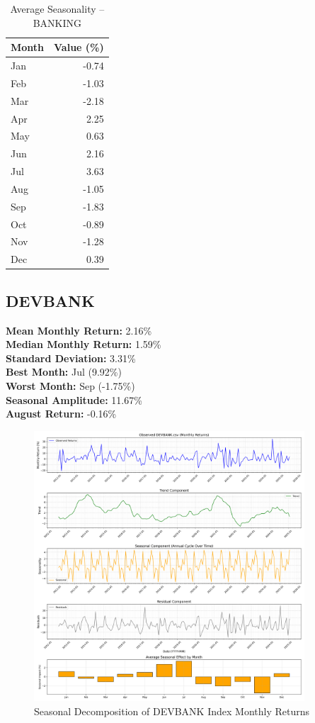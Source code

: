 \documentclass[12pt]{article}
\begin{document}
\begin{table}[h!]
\centering
\caption{Average Seasonality -- BANKING}
\begin{tabular}{l r}
\toprule
Month & Value (\%) \\
\midrule
Jan & -0.74 \\
Feb & -1.03 \\
Mar & -2.18 \\
Apr & 2.25 \\
May & 0.63 \\
Jun & 2.16 \\
Jul & 3.63 \\
Aug & -1.05 \\
Sep & -1.83 \\
Oct & -0.89 \\
Nov & -1.28 \\
Dec & 0.39 \\
\bottomrule
\end{tabular}
\end{table}


\clearpage

\subsection{DEVBANK}
\textbf{Mean Monthly Return:} 2.16\% \\
\textbf{Median Monthly Return:} 1.59\% \\
\textbf{Standard Deviation:} 3.31\% \\
\textbf{Best Month:} Jul (9.92\%) \\
\textbf{Worst Month:} Sep (-1.75\%) \\
\textbf{Seasonal Amplitude:} 11.67\% \\
\textbf{August Return:} -0.16\% \\

\begin{figure}[h!]
    \centering
    \includegraphics[width=0.9\textwidth]{decomposition_outputs/DEVBANK_seasonal_decomposition.png}
    \caption{Seasonal Decomposition of DEVBANK Index Monthly Returns}
\end{figure}
\end{document}

